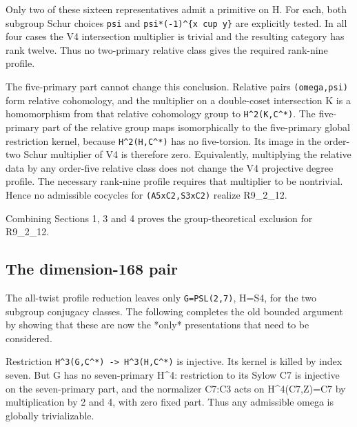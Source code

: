 Only two of these sixteen representatives admit a primitive on H. For
each, both subgroup Schur choices \texttt{psi} and
\texttt{psi*(-\allowbreak{}1)\textasciicircum{}\{x \allowbreak{}cup y\}\allowbreak{}}
are explicitly tested. In all four cases the V4 intersection multiplier
is trivial and the resulting category has rank twelve. Thus no
two-primary relative class gives the required rank-nine profile.

The five-primary part cannot change this conclusion. Relative pairs
\texttt{(omega\allowbreak{},psi)} form relative cohomology, and the
multiplier on a double-coset intersection K is a homomorphism from that
relative cohomology group to
\texttt{H\textasciicircum{}2(K,\allowbreak{}C\textasciicircum{}*)}. The
five-primary part of the relative group maps isomorphically to the
five-primary global restriction kernel, because
\texttt{H\textasciicircum{}2(H,\allowbreak{}C\textasciicircum{}*)} has
no five-torsion. Its image in the order-two Schur multiplier of V4 is
therefore zero. Equivalently, multiplying the relative data by any
order-five relative class does not change the V4 projective degree
profile. The necessary rank-nine profile requires that multiplier to be
nontrivial. Hence no admissible cocycles for
\texttt{(A5xC2\allowbreak{},S3xC2\allowbreak{})} realize R9\_2\_12.

Combining Sections 1, 3 and 4 proves the group-theoretical exclusion for
R9\_2\_12.

\hypertarget{the-dimension-168-pair}{%
\subsection{The dimension-168 pair}\label{the-dimension-168-pair}}

The all-twist profile reduction leaves only
\texttt{G=PSL(\allowbreak{}2,7)}, H=S4, for the two subgroup conjugacy
classes. The following completes the old bounded argument by showing
that these are now the *only* presentations that need to be considered.

Restriction
\texttt{H\textasciicircum{}3(G,\allowbreak{}C\textasciicircum{}*) -\allowbreak{}> H\textasciicircum{}3(\allowbreak{}H,C\textasciicircum{}*)\allowbreak{}}
is injective. Its kernel is killed by index seven. But G has no
seven-primary H\^{}4: restriction to its Sylow C7 is injective on the
seven-primary part, and the normalizer C7:C3 acts on H\^{}4(C7,Z)=C7 by
multiplication by 2 and 4, with zero fixed part. Thus any admissible
omega is globally trivializable.

